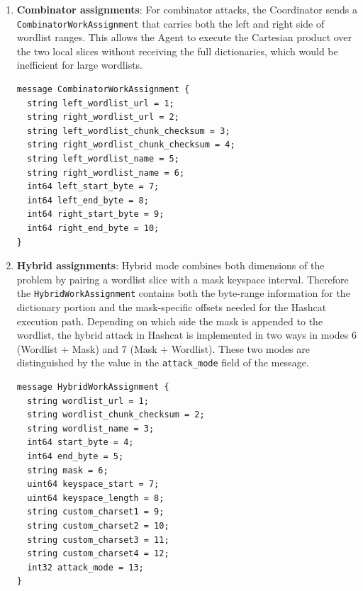 \begin{enumerate}
\begin{enumerate}
\begin{verbatim}
message DictionaryWorkAssignment {
  string wordlist_url = 1;
  string wordlist_chunk_checksum = 2;
  string wordlist_name = 3;
  int64 start_byte = 4;
  int64 end_byte = 5;
}
\end{verbatim}

        \item \textbf{Combinator assignments}: For combinator attacks, the Coordinator sends a \verb|CombinatorWorkAssignment| that carries both the left and right side of wordlist ranges. This allows the Agent to execute the Cartesian product over the two local slices without receiving the full dictionaries, which would be inefficient for large wordlists.

\begin{verbatim}
message CombinatorWorkAssignment {
  string left_wordlist_url = 1;
  string right_wordlist_url = 2;
  string left_wordlist_chunk_checksum = 3;
  string right_wordlist_chunk_checksum = 4;
  string left_wordlist_name = 5;
  string right_wordlist_name = 6;
  int64 left_start_byte = 7;
  int64 left_end_byte = 8;
  int64 right_start_byte = 9;
  int64 right_end_byte = 10;
}
\end{verbatim}

        \item \textbf{Hybrid assignments}: Hybrid mode combines both dimensions of the problem by pairing a wordlist slice with a mask keyspace interval. Therefore the \verb|HybridWorkAssignment| contains both the byte-range information for the dictionary portion and the mask-specific offsets needed for the Hashcat execution path. Depending on which side the mask is appended to the wordlist, the hybrid attack in Hashcat is implemented in two ways in modes 6 (Wordlist + Mask) and 7 (Mask + Wordlist). These two modes are distinguished by the value in the \verb|attack_mode| field of the message. 

\begin{verbatim}
message HybridWorkAssignment {
  string wordlist_url = 1;
  string wordlist_chunk_checksum = 2;
  string wordlist_name = 3;
  int64 start_byte = 4;
  int64 end_byte = 5;
  string mask = 6;
  uint64 keyspace_start = 7;
  uint64 keyspace_length = 8;
  string custom_charset1 = 9;
  string custom_charset2 = 10;
  string custom_charset3 = 11;
  string custom_charset4 = 12;
  int32 attack_mode = 13;
}
\end{verbatim}

\end{enumerate}
\end{enumerate}
